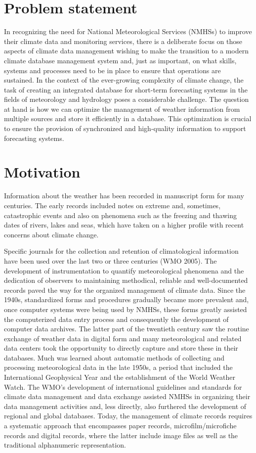 \section{Problem statement}

In recognizing the need for National Meteorological Services (NMHSs) to improve their climate data and monitoring services, there is a deliberate focus on those aspects of climate data management wishing to make the transition to a modern climate database management system and, just as important, on what skills, systems and processes need to be in place to ensure that operations are sustained. In the context of the ever-growing complexity of climate change, the task of creating an integrated database for short-term forecasting systems in the fields of meteorology and hydrology poses a considerable challenge. The question at hand is how we can optimize the management of weather information from multiple sources and store it efficiently in a database. This optimization is crucial to ensure the provision of synchronized and high-quality information to support forecasting systems.

\section{Motivation}


Information about the weather has been recorded in manuscript form for many
centuries. The early records included notes on extreme and, sometimes,
catastrophic events and also on phenomena such as the freezing and thawing dates
of rivers, lakes and seas, which have taken on a higher profile with recent
concerns about climate change.

Specific journals for the collection and retention of climatological information
have been used over the last two or three centuries (WMO 2005). The development
of instrumentation to quantify meteorological phenomena and the dedication of
observers to maintaining methodical, reliable and well-documented records paved
the way for the organized management of climate data. Since the 1940s,
standardized forms and procedures gradually became more prevalent and, once
computer systems were being used by NMHSs, these forms greatly assisted the
computerized data entry process and consequently the development of computer
data archives. The latter part of the twentieth century saw the routine exchange
of weather data in digital form and many meteorological and related data centers
took the opportunity to directly capture and store these in their databases.
Much was learned about automatic methods of collecting and processing
meteorological data in the late 1950s, a period that included the International
Geophysical Year and the establishment of the World Weather Watch. The WMO’s
development of international guidelines and standards for climate data
management and data exchange assisted NMHSs in organizing their data management
activities and, less directly, also furthered the development of regional and
global databases. Today, the management of climate records requires a systematic
approach that encompasses paper records, microfilm/microfiche records and
digital records, where the latter include image files as well as the traditional
alphanumeric representation.


